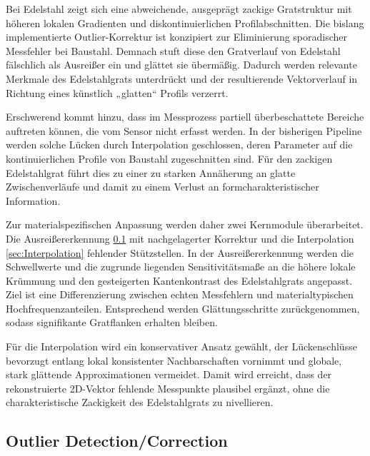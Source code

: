 Bei Edelstahl zeigt sich eine abweichende, ausgeprägt zackige Gratstruktur mit höheren lokalen Gradienten und diskontinuierlichen Profilabschnitten. Die bislang implementierte Outlier-Korrektur ist konzipiert zur Eliminierung sporadischer Messfehler bei Baustahl. Demnach stuft diese den Gratverlauf von Edelstahl fälschlich als Ausreißer ein und glättet sie übermäßig. Dadurch werden relevante Merkmale des Edelstahlgrats unterdrückt und der resultierende Vektorverlauf in Richtung eines künstlich „glatten“ Profils verzerrt.

Erschwerend kommt hinzu, dass im Messprozess partiell überbeschattete Bereiche auftreten können, die vom Sensor nicht erfasst werden. In der bisherigen Pipeline werden solche Lücken durch Interpolation geschlossen, deren Parameter auf die kontinuierlichen Profile von Baustahl zugeschnitten sind. Für den zackigen Edelstahlgrat führt dies zu einer zu starken Annäherung an glatte Zwischenverläufe und damit zu einem Verlust an formcharakteristischer Information.

Zur materialspezifischen Anpassung werden daher zwei Kernmodule überarbeitet. Die Ausreißererkennung \cref{sec:Outlier Detection/Correction} mit nachgelagerter Korrektur und die Interpolation \cref{sec:Interpolation} fehlender Stützstellen. In der Ausreißererkennung werden die Schwellwerte und die zugrunde liegenden Sensitivitätsmaße an die höhere lokale Krümmung und den gesteigerten Kantenkontrast des Edelstahlgrats angepasst. Ziel ist eine Differenzierung zwischen echten Messfehlern und materialtypischen Hochfrequenzanteilen. Entsprechend werden Glättungsschritte zurückgenommen, sodass signifikante Gratflanken erhalten bleiben. 

Für die Interpolation wird ein konservativer Ansatz gewählt, der Lückenschlüsse bevorzugt entlang lokal konsistenter Nachbarschaften vornimmt und globale, stark glättende Approximationen vermeidet. Damit wird erreicht, dass der rekonstruierte 2D-Vektor fehlende Messpunkte plausibel ergänzt, ohne die charakteristische Zackigkeit des Edelstahlgrats zu nivellieren.

\subsection{Outlier Detection/Correction}
\label{sec:Outlier Detection/Correction}

